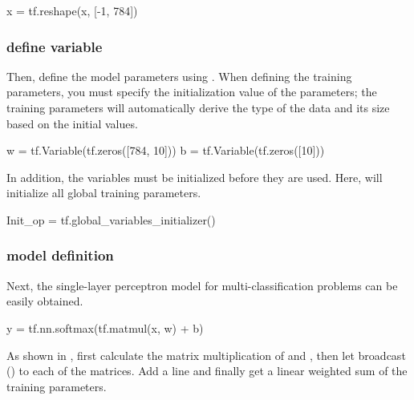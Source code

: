 \begin{content}
\begin{leftbar}
\begin{python}
x = tf.reshape(x, [-1, 784])
\end{python}
\end{leftbar}

\subsubsection{define variable}

Then, define the model parameters using . When defining the training parameters, you must specify the initialization value of the parameters; the training parameters will automatically derive the type of the data and its size based on the initial values.

\begin{leftbar}
\begin{python}
w = tf.Variable(tf.zeros([784, 10]))
b = tf.Variable(tf.zeros([10]))
\end{python}
\end{leftbar}

In addition, the variables must be initialized before they are used. Here,  will initialize all global training parameters.

\begin{leftbar}
\begin{python}
Init_op = tf.global_variables_initializer()
\end{python}
\end{leftbar}

\subsubsection{model definition}

Next, the single-layer perceptron model for multi-classification problems can be easily obtained.

\begin{leftbar}
\begin{python}
y = tf.nn.softmax(tf.matmul(x, w) + b)
\end{python}
\end{leftbar}

As shown in , first calculate the matrix multiplication of  and , then let  broadcast () to each of the matrices. Add a line and finally get a linear weighted sum of the training parameters.


\end{content}
